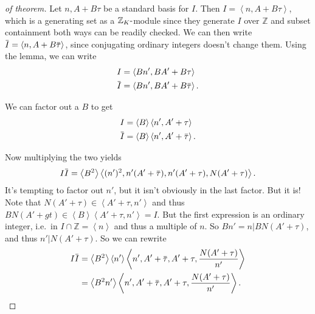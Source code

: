 \begin{proof}[of theorem]

Let \(n, A + B \tau\) be a standard basis for \(I\). Then
\(I = \left\langle{ n, A+ B \tau }\right\rangle\), which is a generating
set as a \({\mathbb{Z}}_K{\hbox{-}}\)module since they generate \(I\)
over \({\mathbb{Z}}\) and subset containment both ways can be readily
checked. We can then write
\(\mkern 1.5mu\overline{\mkern-1.5muI\mkern-1.5mu}\mkern 1.5mu = \left\langle{ n, A+B \mkern 1.5mu\overline{\mkern-1.5mu\tau \mkern-1.5mu}\mkern 1.5mu}\right\rangle\),
since conjugating ordinary integers doesn't change them. Using the
lemma, we can write
\begin{align*}
I &= \left\langle{ Bn', BA' + B \tau }\right\rangle\\
\mkern 1.5mu\overline{\mkern-1.5muI\mkern-1.5mu}\mkern 1.5mu &= \left\langle{ Bn', BA' + B \mkern 1.5mu\overline{\mkern-1.5mu\tau\mkern-1.5mu}\mkern 1.5mu }\right\rangle
.\end{align*}

We can factor out a \(B\) to get
\begin{align*}
I &= \left\langle{ B }\right\rangle \left\langle{ n', A' + \tau}\right\rangle \\  
\mkern 1.5mu\overline{\mkern-1.5muI\mkern-1.5mu}\mkern 1.5mu &= \left\langle{ B }\right\rangle \left\langle{ n', A' + \mkern 1.5mu\overline{\mkern-1.5mu\tau\mkern-1.5mu}\mkern 1.5mu }\right\rangle 
.\end{align*}

Now multiplying the two yields
\begin{align*}
I \mkern 1.5mu\overline{\mkern-1.5muI\mkern-1.5mu}\mkern 1.5mu = \left\langle{ B^2 }\right\rangle \left\langle{ (n')^2, n'(A' + \mkern 1.5mu\overline{\mkern-1.5mu \tau\mkern-1.5mu}\mkern 1.5mu ), n'(A' + \tau), N(A' + \tau) }\right\rangle  
.\end{align*}
It's tempting to factor out \(n'\), but it isn't obviously in the last
factor. But it is! Note that
\(N(A' + \tau) \in \left\langle{ A' + \tau, n' }\right\rangle\) and thus
\(B N(A' + gt) \in \left\langle{ B }\right\rangle \left\langle{ A' + \tau, n' }\right\rangle = I\).
But the first expression is an ordinary integer, i.e.~in
\(I \cap{\mathbb{Z}}= \left\langle{ n }\right\rangle\) and thus a
multiple of \(n\). So \(Bn' = n \mathrel{\Big|}BN(A' + \tau)\), and thus
\(n' \mathrel{\Big|}N(A' + \tau)\). So we can rewrite
\begin{align*}
I \mkern 1.5mu\overline{\mkern-1.5muI\mkern-1.5mu}\mkern 1.5mu 
&= \left\langle{ B^2 }\right\rangle \left\langle{ n' }\right\rangle \left\langle{ n', A' + \mkern 1.5mu\overline{\mkern-1.5mu \tau\mkern-1.5mu}\mkern 1.5mu , A' + \tau, { N(A' + \tau) \over n'} }\right\rangle   \\
&= \left\langle{ B^2 n' }\right\rangle 
\left\langle{ n', A' + \mkern 1.5mu\overline{\mkern-1.5mu \tau\mkern-1.5mu}\mkern 1.5mu , A' + \tau, { N(A' + \tau) \over  n'} }\right\rangle   
.\end{align*}


\end{proof}
